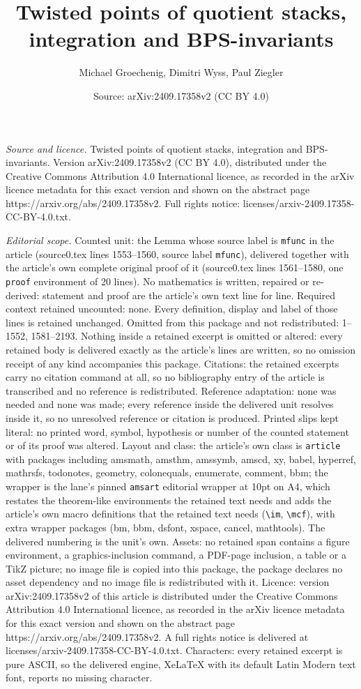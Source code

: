 \documentclass[10pt,a4paper]{amsart}
\title[Twisted points of quotient stacks, integration and BPS-invar]{Twisted points of quotient stacks, integration and BPS-invariants}
\author{Michael Groechenig, Dimitri Wyss, Paul Ziegler}
\date{Source: arXiv:2409.17358v2 (CC BY 4.0)}
\begin{document}
\maketitle

\noindent\emph{Source and licence.} Twisted points of quotient stacks, integration and BPS-invariants. Version arXiv:2409.17358v2 (CC BY 4.0), distributed under the Creative Commons Attribution 4.0 International licence, as recorded in the arXiv licence metadata for this exact version and shown on the abstract page https://arxiv.org/abs/2409.17358v2. Full rights notice: licenses/arxiv-2409.17358-CC-BY-4.0.txt.\par\smallskip

\noindent\textit{Editorial scope.} Counted unit: the Lemma whose source label is \texttt{mfunc} in the article (source0.tex lines 1553--1560, source label \texttt{mfunc}), delivered together with the article's own complete original proof of it (source0.tex lines 1561--1580, one \texttt{proof} environment of 20 lines). No mathematics is written, repaired or re-derived: statement and proof are the article's own text line for line. Required context retained uncounted: none. Every definition, display and label of those lines is retained unchanged. Omitted from this package and not redistributed: 1--1552, 1581--2193. Nothing inside a retained excerpt is omitted or altered: every retained body is delivered exactly as the article's lines are written, so no omission receipt of any kind accompanies this package. Citations: the retained excerpts carry no citation command at all, so no bibliography entry of the article is transcribed and no reference is redistributed. Reference adaptation: none was needed and none was made; every reference inside the delivered unit resolves inside it, so no unresolved reference or citation is produced. Printed slips kept literal: no printed word, symbol, hypothesis or number of the counted statement or of its proof was altered. Layout and class: the article's own class is \texttt{article} with packages including amsmath, amsthm, amssymb, amscd, xy, babel, hyperref, mathrsfs, todonotes, geometry, colonequals, enumerate, comment, bbm; the wrapper is the lane's pinned \texttt{amsart} editorial wrapper at 10pt on A4, which restates the theorem-like environments the retained text needs and adds the article's own macro definitions that the retained text needs (\texttt{\textbackslash im}, \texttt{\textbackslash mcf}), with extra wrapper packages (bm, bbm, dsfont, xspace, cancel, mathtools). The delivered numbering is the unit's own. Assets: no retained span contains a figure environment, a graphics-inclusion command, a PDF-page inclusion, a table or a TikZ picture; no image file is copied into this package, the package declares no asset dependency and no image file is redistributed with it. Licence: version arXiv:2409.17358v2 of this article is distributed under the Creative Commons Attribution 4.0 International licence, as recorded in the arXiv licence metadata for this exact version and shown on the abstract page https://arxiv.org/abs/2409.17358v2. A full rights notice is delivered at licenses/arxiv-2409.17358-CC-BY-4.0.txt. Characters: every retained excerpt is pure ASCII, so the delivered engine, XeLaTeX with its default Latin Modern text font, reports no missing character.
\end{document}
